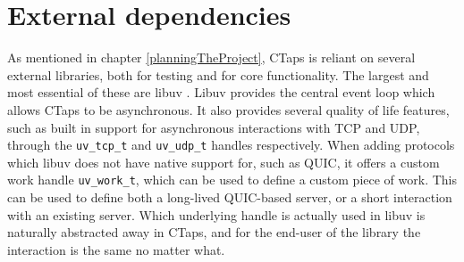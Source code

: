 \chapter{External dependencies}
As mentioned in chapter \ref{planningTheProject}, CTaps is reliant on several
external libraries, both for testing and for core functionality. The largest
and most essential of these are libuv \cite{Libuv2025}. Libuv provides the central
event loop which allows CTaps to be asynchronous. It also provides several quality
of life features, such as built in support for asynchronous interactions with TCP
and UDP, through the \texttt{uv\_tcp\_t} and \texttt{uv\_udp\_t} handles respectively.
When adding protocols which libuv does not have native support for, such as QUIC,
it offers a custom work handle \texttt{uv\_work\_t}, which can be used to define
a custom piece of work. This can be used to define both a long-lived QUIC-based
server, or a short interaction with an existing server. Which underlying handle
is actually used in libuv is naturally abstracted away in CTaps, and for the
end-user of the library the interaction is the same no matter what. 
